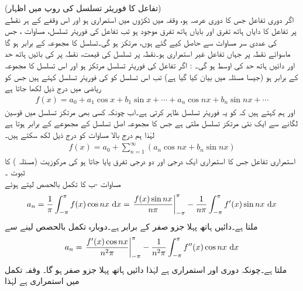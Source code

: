 \quad (تفاعل کا فوریئر تسلسل کی روپ میں اظہار)\\
اگر دوری تفاعل  جس کا دوری عرصہ  ہو، وقفہ  میں ٹکڑوں میں استمراری ہو اور اس وقفے کے ہر نقطے پر تفاعل کا دایاں ہاتھ تفرق اور بایاں ہاتھ تفرق موجود ہو تب  تفاعل کی فوریئر تسلسل، مساوات ، جس  کی عددی سر  مساوات  سے حاصل کیے گئے ہوں، مرتکز ہو گی۔تسلسل کا مجموعہ  کے برابر ہو گا ماسوائے  نقطہ  پر جہاں تفاعل غیر استمراری ہو۔نقطہ  پر تسلسل کی قیمت،  نقطہ  پر  کی بائیں ہاتھ حد اور دائیں ہاتھ حد کی اوسط ہو گی۔ 
: اگر تفاعل  کی فوریئر تسلسل مرتکز ہو اور اس تسلسل کا مجموعہ  کے برابر ہو  (جیسا مسئلہ  میں بیان کیا گیا ہے) تب اس تسلسل کو  کی فوریئر تسلسل کہتے ہیں جس کو ریاضی میں درج ذیل لکھا جاتا ہے
\begin{align*}
f(x)=a_0+a_1\cos x+b_1\sin x+\cdots+a_n\cos nx+b_n\sin nx+\cdots
\end{align*} 
اور ہم کہتے ہیں کہ  کو یہ فوریئر تسلسل ظاہر کرتی ہے۔اب چونکہ کسی بھی مرتکز تسلسل میں قوسین لگانے سے  ایک نئی مرتکز تسلسل ملتی ہے جس کا مجموعہ اصل تسلسل کے مجموعے کے برابر ہوتا ہے لہٰذا ہم درج بالا مساوات کو درج ذیل لکھ سکتے ہیں۔
\begin{align*}
f(x)=a_0+\sum_{n=1}^{\infty}(a_n\cos nx+b_n\sin nx)
\end{align*}
\quad استمراری تفاعل  جس کا استمراری ایک درجی اور دو درجی تفرق پایا جاتا ہو کی مرکوزیت  (مسئلہ ) کا ثبوت ۔\\
مساوات -ب  کا تکمل بالحصص لیتے ہوئے
\begin{align*}
a_n=\frac{1}{\pi}\int_{-\pi}^{\pi}f(x)\cos nx \,\dif x=\left. \frac{f(x)\sin nx}{n\pi}\right|_{-\pi}^{\pi}-\frac{1}{n\pi}\int_{-\pi}^{\pi} f'(x)\sin nx\,\dif x
\end{align*}
ملتا ہے۔دائیں ہاتھ پہلا جزو صفر کے برابر ہے۔دوبارہ تکمل بالحصص لینے سے
\begin{align*}
a_n=\left.\frac{f'(x)\cos nx}{n^2\pi}\right|_{-\pi}^{\pi}-\frac{1}{n^2\pi}\int_{-\pi}^{\pi} f''(x)\cos nx\, \dif x
\end{align*}
ملتا ہے۔چونکہ   دوری اور استمراری ہے لہٰذا دائیں ہاتھ پہلا جزو صفر ہو گا۔ وقفہ تکمل  میں  استمراری ہے لہٰذا 
